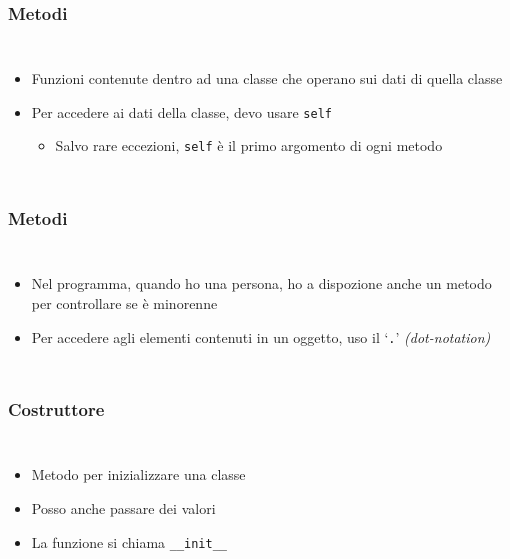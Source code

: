 \begin{contentframe}
    \frametitle{Metodi}

    \begin{columns}
        \begin{itemize}
            \item Funzioni contenute dentro ad una classe che operano sui dati di quella classe

            \bigskip
            \item Per accedere ai dati della classe, devo usare \texttt{self}
            \begin{itemize}
                \item Salvo rare eccezioni, \texttt{self} è il primo argomento di ogni metodo
            \end{itemize}
        \end{itemize}
        
        \centering
    \end{columns}
\end{contentframe}

\begin{contentframe}
    \frametitle{Metodi}

    \begin{columns}
        \begin{itemize}
            \item Nel programma, quando ho una persona, ho a dispozione anche un metodo per controllare se è minorenne

            \bigskip
            \item Per accedere agli elementi contenuti in un oggetto, uso il `\texttt{.}' \textit{(dot-notation)}
        \end{itemize}
        
        \centering
    \end{columns}
\end{contentframe}

\begin{contentframe}
    \frametitle{Costruttore}

    \begin{columns}
        \begin{itemize}
            \item Metodo per inizializzare una classe
            \item Posso anche passare dei valori

            \bigskip
            \item La funzione si chiama \texttt{\_\_init\_\_}
        \end{itemize}
        
        \centering
    \end{columns}
\end{contentframe}

